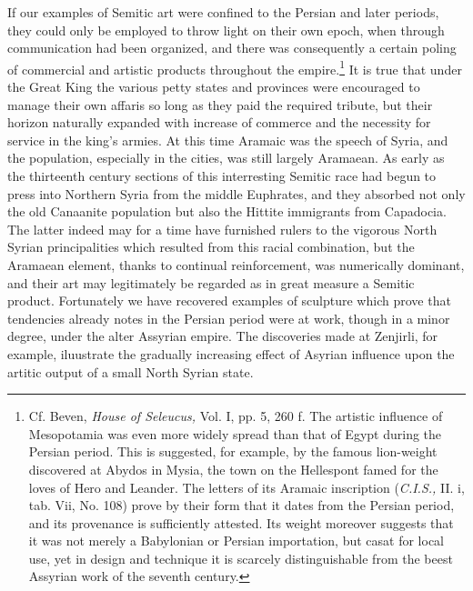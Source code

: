 \documentclass[12pt,oneside]{book}
\begin{document}
If our examples of Semitic art were confined to the Persian and later periods, they could only be employed to throw light on their own epoch, when through communication had been organized, and there was consequently a certain poling of commercial and artistic products throughout the empire.\footnote{Cf. Beven, \textit{House of Seleucus,} Vol. I, pp. 5, 260 f. The artistic influence of Mesopotamia was even more widely spread than that of Egypt during the Persian period. This is suggested, for example, by the famous lion-weight discovered at Abydos in Mysia, the town on the Hellespont famed for the loves of Hero and Leander. The letters of its Aramaic inscription (\textit{C.I.S.,} II. i, tab. Vii, No. 108) prove by their form that it dates from the Persian period, and its provenance is sufficiently attested. Its weight moreover suggests that it was not merely a Babylonian or Persian importation, but casat for local use, yet in design and technique it is scarcely distinguishable from the beest Assyrian work of the seventh century.} It is true that under the Great King the various petty states and provinces were encouraged to manage their own affaris so long as they paid the required tribute, but their horizon naturally expanded with increase of commerce and the necessity for service in the king's armies. At this time Aramaic was the speech of Syria, and the population, especially in the cities, was still largely Aramaean. As early as the thirteenth century sections of this interresting Semitic race had begun to press into Northern Syria from the middle Euphrates, and they absorbed not only the old Canaanite population but also the Hittite immigrants from Capadocia. The latter indeed may for a time have furnished rulers to the vigorous North Syrian principalities which resulted from this racial combination, but the Aramaean element, thanks to continual reinforcement, was numerically dominant, and their art may legitimately be regarded as in great measure a Semitic product. Fortunately we have recovered examples of sculpture which prove that tendencies already notes in the Persian period were at work, though in a minor degree, under the alter Assyrian empire. The discoveries made at Zenjirli, for example, iluustrate the gradually increasing effect of Asyrian influence upon the artitic output of a small North Syrian state. \par 
\end{document}

